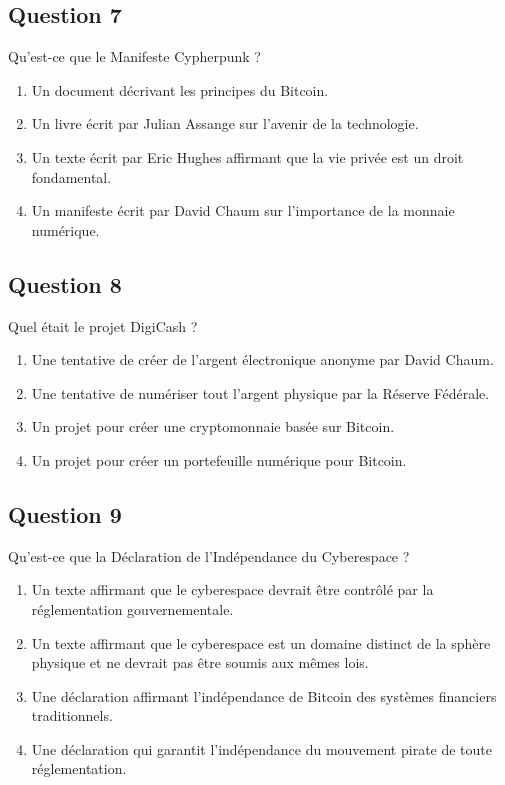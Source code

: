 \documentclass[12pt,a4paper]{article}
\begin{document}
\bigskip


\subsection*{Question 7}
Qu'est-ce que le Manifeste Cypherpunk ?

\begin{enumerate}[label=\Alph*., leftmargin=*]
\item Un document décrivant les principes du Bitcoin.
\item Un livre écrit par Julian Assange sur l'avenir de la technologie.
\item Un texte écrit par Eric Hughes affirmant que la vie privée est un droit fondamental.
\item Un manifeste écrit par David Chaum sur l'importance de la monnaie numérique.
\end{enumerate}

\bigskip


\subsection*{Question 8}
Quel était le projet DigiCash ?

\begin{enumerate}[label=\Alph*., leftmargin=*]
\item Une tentative de créer de l'argent électronique anonyme par David Chaum.
\item Une tentative de numériser tout l'argent physique par la Réserve Fédérale.
\item Un projet pour créer une cryptomonnaie basée sur Bitcoin.
\item Un projet pour créer un portefeuille numérique pour Bitcoin.
\end{enumerate}

\bigskip


\subsection*{Question 9}
Qu'est-ce que la Déclaration de l'Indépendance du Cyberespace ?

\begin{enumerate}[label=\Alph*., leftmargin=*]
\item Un texte affirmant que le cyberespace devrait être contrôlé par la réglementation gouvernementale.
\item Un texte affirmant que le cyberespace est un domaine distinct de la sphère physique et ne devrait pas être soumis aux mêmes lois.
\item Une déclaration affirmant l'indépendance de Bitcoin des systèmes financiers traditionnels.
\item Une déclaration qui garantit l'indépendance du mouvement pirate de toute réglementation.
\end{enumerate}
\end{document}

